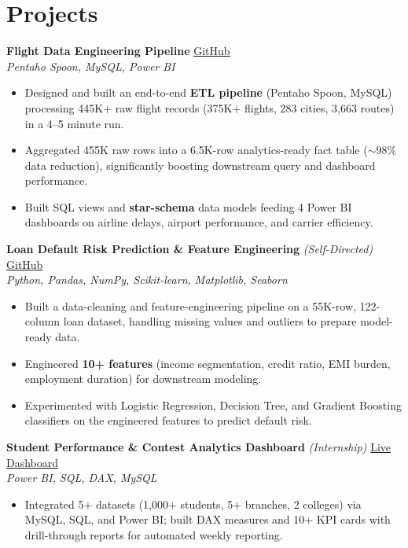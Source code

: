 \documentclass[a4paper,10pt]{article}
\begin{document}
\section{Projects}
\textbf{Flight Data Engineering Pipeline} \hfill \href{https://github.com/Rider-04/flight-data-engineering-pipeline.git}{GitHub} \\
\textit{Pentaho Spoon, MySQL, Power BI}
\begin{itemize}[nosep,after=\strut, leftmargin=1em, itemsep=1pt,label=--]
\item Designed and built an end-to-end \textbf{ETL pipeline} (Pentaho Spoon, MySQL) processing 445K+ raw flight records (375K+ flights, 283 cities, 3,663 routes) in a 4--5 minute run.
\item Aggregated 455K raw rows into a 6.5K-row analytics-ready fact table ($\sim$98\% data reduction), significantly boosting downstream query and dashboard performance.
\item Built SQL views and \textbf{star-schema} data models feeding 4 Power BI dashboards on airline delays, airport performance, and carrier efficiency.
\end{itemize}
\vspace{2pt}
\textbf{Loan Default Risk Prediction \& Feature Engineering} \textit{(Self-Directed)} \hfill \href{https://github.com/Rider-04/bank-loan-default-risk-analysis}{GitHub} \\
\textit{Python, Pandas, NumPy, Scikit-learn, Matplotlib, Seaborn}
\begin{itemize}[nosep,after=\strut, leftmargin=1em, itemsep=1pt,label=--]
\item Built a data-cleaning and feature-engineering pipeline on a 55K-row, 122-column loan dataset, handling missing values and outliers to prepare model-ready data.
\item Engineered \textbf{10+ features} (income segmentation, credit ratio, EMI burden, employment duration) for downstream modeling.
\item Experimented with Logistic Regression, Decision Tree, and Gradient Boosting classifiers on the engineered features to predict default risk.
\end{itemize}
\vspace{2pt}
\textbf{Student Performance \& Contest Analytics Dashboard} \textit{(Internship)} \hfill \href{https://app.powerbi.com/links/q7Z6OSaJ-t?ctid=0d11b6ec-52ac-4a84-9442-43048f433ac9&pbi_source=linkShare}{Live Dashboard} \\
\textit{Power BI, SQL, DAX, MySQL}
\begin{itemize}[nosep,after=\strut, leftmargin=1em, itemsep=1pt,label=--]
\item Integrated 5+ datasets (1,000+ students, 5+ branches, 2 colleges) via MySQL, SQL, and Power BI; built DAX measures and 10+ KPI cards with drill-through reports for automated weekly reporting.
\end{itemize}
\vspace{2pt}
\end{document}
